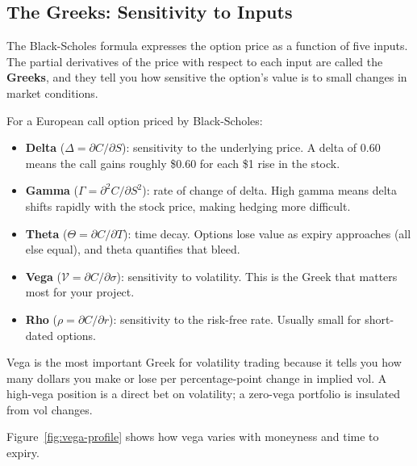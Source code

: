 \subsection{The Greeks: Sensitivity to Inputs}
\label{sec:greeks}

The Black-Scholes formula expresses the option price as a function of five inputs.
The partial derivatives of the price with respect to each input are called the \textbf{Greeks}, and they tell you how sensitive the option's value is to small changes in market conditions.

\begin{definition}
\label{def:greeks}
For a European call option priced by Black-Scholes:
\begin{itemize}[nosep]
  \item \textbf{Delta} ($\Delta = \partial C / \partial S$): sensitivity to the underlying price. A delta of 0.60 means the call gains roughly \$0.60 for each \$1 rise in the stock.
  \item \textbf{Gamma} ($\Gamma = \partial^2 C / \partial S^2$): rate of change of delta. High gamma means delta shifts rapidly with the stock price, making hedging more difficult.
  \item \textbf{Theta} ($\Theta = \partial C / \partial T$): time decay. Options lose value as expiry approaches (all else equal), and theta quantifies that bleed.
  \item \textbf{Vega} ($\mathcal{V} = \partial C / \partial \sigma$): sensitivity to volatility. This is the Greek that matters most for your project.
  \item \textbf{Rho} ($\rho = \partial C / \partial r$): sensitivity to the risk-free rate. Usually small for short-dated options.
\end{itemize}
\end{definition}

\begin{intuition}
Vega is the most important Greek for volatility trading because it tells you how many dollars you make or lose per percentage-point change in implied vol.
A high-vega position is a direct bet on volatility; a zero-vega portfolio is insulated from vol changes.
\end{intuition}

Figure~\ref{fig:vega-profile} shows how vega varies with moneyness and time to expiry.

